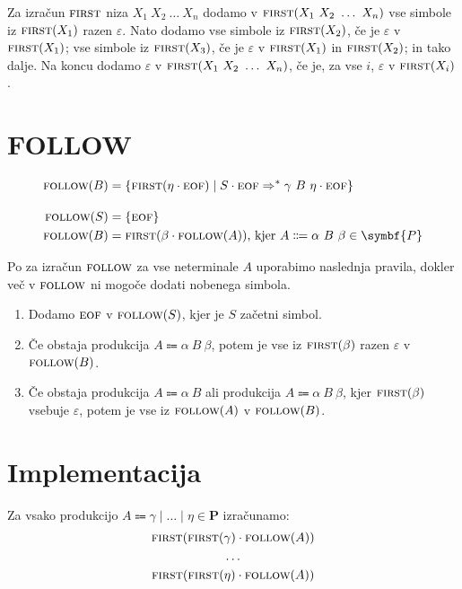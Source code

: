 \documentclass{report}
\newcommand{\Null}{\varepsilon}
\newcommand{\Seq}{\cdot}
\newcommand{\Spc}{\ }
\newcommand{\Union}{\mathrel{|}}
\newcommand{\Set}[1]{\symbf{#1}}
\newcommand{\FIRST}{\textsc{first}}
\newcommand{\FOLLOW}{\textsc{follow}}
\newcommand{\EOF}{\textsc{eof}}
\newcommand{\Productions}{\Set{P}}
\newcommand{\Arrow}{\Coloneq}
\newlength{\arrow}
\newcommand{\DeriveStar}{\Rightarrow^\ast}
\newcommand{\NT}[1]{{#1}}
\newcommand{\Sym}[1]{{#1}}
\begin{document}
    Za izračun $\FIRST$ niza $\Sym{X}_1 \Spc \Sym{X}_2 \Spc \dots \Spc \Sym{X}_n$ dodamo v $\FIRST(\Sym{X}_1 \Spc \Sym{X}_2 \Spc \dots \Spc \Sym{X}_n)$ vse simbole iz $\FIRST(\Sym{X}_1)$ razen $\Null$. Nato dodamo vse simbole iz $\FIRST(\Sym{X}_2)$, če je $\Null$ v $\FIRST(\Sym{X}_1)$; vse simbole iz $\FIRST(\Sym{X}_3)$, če je $\Null$ v $\FIRST(\Sym{X}_1)$ in $\FIRST(\Sym{X}_2)$; in tako dalje.
    Na koncu dodamo $\Null$ v $\FIRST(\Sym{X}_1 \Spc \Sym{X}_2 \Spc \dots \Spc \Sym{X}_n)$, če je, za vse $i$, $\Null$ v $\FIRST(\Sym{X}_i)$.

    \section{FOLLOW}
    \begin{tcolorbox}[title={Definicija}]
      \begin{equation*}
        \begin{aligned}
          \FOLLOW(\NT{B}) &= \{ \FIRST(\eta \Seq \EOF) \mid \NT{S} \Seq \EOF \DeriveStar \gamma \Spc \NT{B} \Spc \eta \Seq \EOF \}\\[1em]
          \FOLLOW(\NT{S}) &= \{\EOF\}\\
          \FOLLOW(\NT{B}) &= \FIRST(\beta \Seq \FOLLOW(\NT{A}))\text{, kjer } \NT{A} \Arrow \alpha \Spc \NT{B} \Spc \beta \in \Productions
        \end{aligned}
      \end{equation*}
    \end{tcolorbox}

    Po \cite{dragonbook} za izračun $\FOLLOW$ za vse neterminale $\NT{A}$ uporabimo naslednja pravila, dokler več v $\FOLLOW$ ni mogoče dodati nobenega simbola.
    \begin{enumerate}
      \item Dodamo $\EOF$ v $\FOLLOW(\NT{S})$, kjer je $\NT{S}$ začetni simbol.
      \item Če obstaja produkcija $\NT{A} \Arrow \alpha \Spc \NT{B} \Spc \beta$, potem je vse iz $\FIRST(\beta)$ razen $\Null$ v $\FOLLOW(\NT{B})$.
      \item Če obstaja produkcija $\NT{A} \Arrow \alpha \Spc \NT{B}$ ali produkcija $\NT{A} \Arrow \alpha \Spc \NT{B} \Spc \beta$, kjer $\FIRST(\beta)$ vsebuje $\Null$, potem je vse iz $\FOLLOW(\NT{A})$ v $\FOLLOW(\NT{B})$.
    \end{enumerate}

    \section{Implementacija}
      Za vsako produkcijo $\NT{A} \Arrow \gamma \Union \dots \Union \eta \in \Productions$ izračunamo:
      \begin{gather*}
        \FIRST(\FIRST(\gamma) \Seq \FOLLOW(\NT{A}))\\
        \dots\\
        \FIRST(\FIRST(\eta) \Seq \FOLLOW(\NT{A}))
      \end{gather*}
\end{document}
